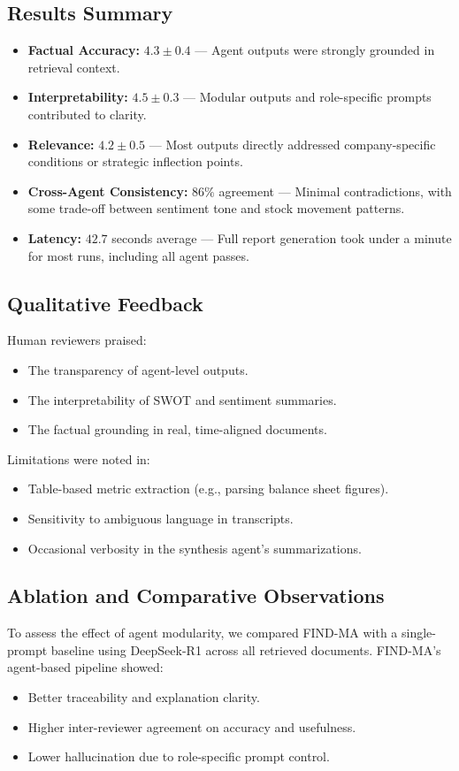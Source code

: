 \documentclass[11pt]{article}
\newcommand{\findma}{\textsc{FIND-MA}}
\begin{document}
\subsection*{Results Summary}
\begin{itemize}
    \item \textbf{Factual Accuracy:} $4.3 \pm 0.4$ — Agent outputs were strongly grounded in retrieval context.
    \item \textbf{Interpretability:} $4.5 \pm 0.3$ — Modular outputs and role-specific prompts contributed to clarity.
    \item \textbf{Relevance:} $4.2 \pm 0.5$ — Most outputs directly addressed company-specific conditions or strategic inflection points.
    \item \textbf{Cross-Agent Consistency:} $86\%$ agreement — Minimal contradictions, with some trade-off between sentiment tone and stock movement patterns.
    \item \textbf{Latency:} $42.7$ seconds average — Full report generation took under a minute for most runs, including all agent passes.
\end{itemize}

\subsection*{Qualitative Feedback}
Human reviewers praised:
\begin{itemize}
    \item The transparency of agent-level outputs.
    \item The interpretability of SWOT and sentiment summaries.
    \item The factual grounding in real, time-aligned documents.
\end{itemize}
Limitations were noted in:
\begin{itemize}
    \item Table-based metric extraction (e.g., parsing balance sheet figures).
    \item Sensitivity to ambiguous language in transcripts.
    \item Occasional verbosity in the synthesis agent’s summarizations.
\end{itemize}

\subsection*{Ablation and Comparative Observations}
To assess the effect of agent modularity, we compared \findma{} with a single-prompt baseline using DeepSeek-R1 across all retrieved documents. \findma{}’s agent-based pipeline showed:
\begin{itemize}
    \item Better traceability and explanation clarity.
    \item Higher inter-reviewer agreement on accuracy and usefulness.
    \item Lower hallucination due to role-specific prompt control.
\end{itemize}
\end{document}
